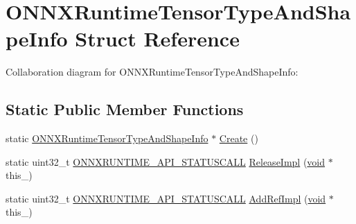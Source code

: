 \hypertarget{structONNXRuntimeTensorTypeAndShapeInfo}{}\section{O\+N\+N\+X\+Runtime\+Tensor\+Type\+And\+Shape\+Info Struct Reference}
\label{structONNXRuntimeTensorTypeAndShapeInfo}


Collaboration diagram for O\+N\+N\+X\+Runtime\+Tensor\+Type\+And\+Shape\+Info\+:
\subsection*{Static Public Member Functions}
\begin{DoxyCompactItemize}
\item 
static \mbox{\hyperlink{structONNXRuntimeTensorTypeAndShapeInfo}{O\+N\+N\+X\+Runtime\+Tensor\+Type\+And\+Shape\+Info}} $\ast$ \mbox{\hyperlink{structONNXRuntimeTensorTypeAndShapeInfo_a77b12cef7f00c2785c7f1c21f2211744}{Create}} ()
\item 
static uint32\+\_\+t \mbox{\hyperlink{error__code_8h_aeaeecdc9b792735c3e26fc0f9815c988}{O\+N\+N\+X\+R\+U\+N\+T\+I\+M\+E\+\_\+\+A\+P\+I\+\_\+\+S\+T\+A\+T\+U\+S\+C\+A\+LL}} \mbox{\hyperlink{structONNXRuntimeTensorTypeAndShapeInfo_a965073446ff8aaad33df5598f965f2e7}{Release\+Impl}} (\mbox{\hyperlink{mlasi_8h_a88f941d423cb2a819b70a1358982b1a6}{void}} $\ast$this\+\_\+)
\item 
static uint32\+\_\+t \mbox{\hyperlink{error__code_8h_aeaeecdc9b792735c3e26fc0f9815c988}{O\+N\+N\+X\+R\+U\+N\+T\+I\+M\+E\+\_\+\+A\+P\+I\+\_\+\+S\+T\+A\+T\+U\+S\+C\+A\+LL}} \mbox{\hyperlink{structONNXRuntimeTensorTypeAndShapeInfo_ab5739090da25c31b51289c6b79b958d8}{Add\+Ref\+Impl}} (\mbox{\hyperlink{mlasi_8h_a88f941d423cb2a819b70a1358982b1a6}{void}} $\ast$this\+\_\+)
\end{DoxyCompactItemize}
